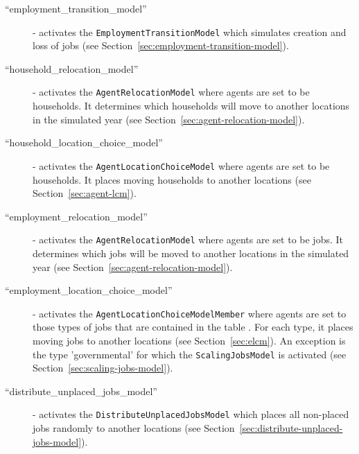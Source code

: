 \begin{description}
  \item[``employment_transition_model''] - activates the
  \verb|EmploymentTransitionModel| which simulates creation and loss of jobs
  (see Section~\ref{sec:employment-transition-model}).
  \item[``household_relocation_model''] - activates the
  \verb|AgentRelocationModel| where agents are set to be households. It
  determines which households will move to another locations in the simulated
  year (see Section~\ref{sec:agent-relocation-model}).
  \item[``household_location_choice_model''] - activates the
  \verb|AgentLocationChoiceModel| where agents are set to be households. It
  places moving households to another locations (see
  Section~\ref{sec:agent-lcm}).
  \item[``employment_relocation_model''] - activates the
  \verb|AgentRelocationModel| where agents are set to be jobs. It determines
  which jobs will be moved to another locations in the simulated year (see
  Section~\ref{sec:agent-relocation-model}).
  \item[``employment_location_choice_model''] - activates the
  \verb|AgentLocationChoiceModelMember| where agents are set to those types of jobs
  that are contained in the table .
  For each type, it places moving jobs to another locations (see
  Section~\ref{sec:elcm}). An exception is the type 'governmental' for which the \verb|ScalingJobsModel| is activated
  (see Section~\ref{sec:scaling-jobs-model}).
  \item[``distribute_unplaced_jobs_model''] - activates the \verb|DistributeUnplacedJobsModel| which
  places  all non-placed jobs randomly to another locations (see Section~\ref{sec:distribute-unplaced-jobs-model}).
\end{description}

